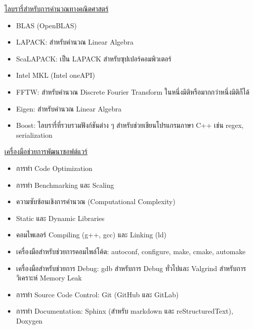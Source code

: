\noindent \underline{ไลบรารี่สำหรับการคำนวณทางคณิตศาสตร์}

\begin{itemize}[topsep=0pt]
  \item BLAS (OpenBLAS)

  \item LAPACK: สำหรับคำนวณ Linear Algebra

  \item ScaLAPACK: เป็น LAPACK สำหรับซุปเปอร์คอมพิวเตอร์

  \item Intel MKL (Intel oneAPI)

  \item FFTW: สำหรับคำนวณ Discrete Fourier Transform ในหนึ่งมิติหรือมากกว่าหนึ่งมิติก็ได้

  \item Eigen: สำหรับคำนวณ Linear Algebra

  \item Boost: ไลบรารี่ที่รวบรวมฟังก์ชันต่าง ๆ สำหรับช่วยเขียนโปรแกรมภาษา C++ เช่น regex, serialization
\end{itemize}

\noindent \underline{เครื่องมือช่วยการพัฒนาซอฟต์แวร์}

\begin{itemize}[topsep=0pt]
  \item การทำ Code Optimization

  \item การทำ Benchmarking และ Scaling

  \item ความซับซ้อนเชิงการคำนวณ (Computational Complexity)

  \item Static และ Dynamic Libraries

  \item คอมไพเลอร์ Compiling (g++, gcc) และ Linking (ld)

  \item เครื่องมือสำหรับช่วยการคอมไพล์โค้ด: autoconf, configure, make, cmake, automake

  \item เครื่องมือสำหรับช่วยการ Debug: gdb สำหรับการ Debug ทั่วไปและ Valgrind สำหรับการวิเคราะห์ Memory Leak

  \item การทำ Source Code Control: Git (GitHub และ GitLab)

  \item การทำ Documentation: Sphinx (สำหรับ markdown และ reStructuredText), Doxygen
\end{itemize}

